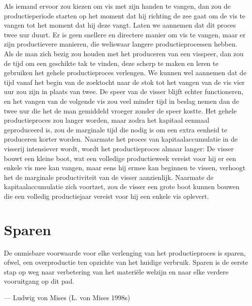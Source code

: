 \documentclass[
  a5paper,
  smalldemyvopaper,11pt,twoside,onecolumn,openright,extrafontsizes,
hidelinks]{memoir}
\begin{document}
Als iemand ervoor zou kiezen om vis met zijn handen te vangen, dan zou
de productieperiode starten op het moment dat hij richting de zee gaat
om de vis te vangen tot het moment dat hij deze vangt. Laten we aannemen
dat dit proces twee uur duurt. Er is geen snellere en directere manier
om vis te vangen, maar er zijn productievere manieren, die weliswaar
langere productieprocessen hebben. Als de man zich bezig zou houden met
het produceren van een visspeer, dan zou de tijd om een geschikte tak te
vinden, deze scherp te maken en leren te gebruiken het gehele
productieproces verlengen. We kunnen wel aannemen dat de tijd vanaf het
begin van de zoektocht naar de stok tot het vangen van de vis vier uur
zou zijn in plaats van twee. De speer van de visser blijft echter
functioneren, en het vangen van de volgende vis zou veel minder tijd in
beslag nemen dan de twee uur die het de man gemiddeld vroeger zonder de
speer kostte. Het gehele productieproces zou langer worden, maar zodra
het kapitaal eenmaal geproduceerd is, zou de marginale tijd die nodig is
om een extra eenheid te produceren korter worden. Naarmate het proces
van kapitaalaccumulatie in de visserij intensiever wordt, wordt het
productieproces almaar langer: De visser bouwt een kleine boot, wat een
volledige productieweek vereist voor hij er een enkele vis mee kan
vangen, maar eens hij ermee kan beginnen te vissen, verhoogt het de
marginale productiviteit van de visser aanzienlijk. Naarmate de
kapitaalaccumulatie zich voortzet, zou de visser een grote boot kunnen
bouwen die een volledig productiejaar vereist voor hij een enkele vis
oplevert.

\section{Sparen}\label{sparen}

De onmisbare voorwaarde voor elke verlenging van het productieproces is
sparen, ofwel, een overproductie ten opzichte van het huidige verbruik.
Sparen is de eerste stap op weg naar verbetering van het materiële
welzijn en naar elke verdere vooruitgang op dit pad.

--- Ludwig von Mises (L. von Mises 1998s)
\end{document}
